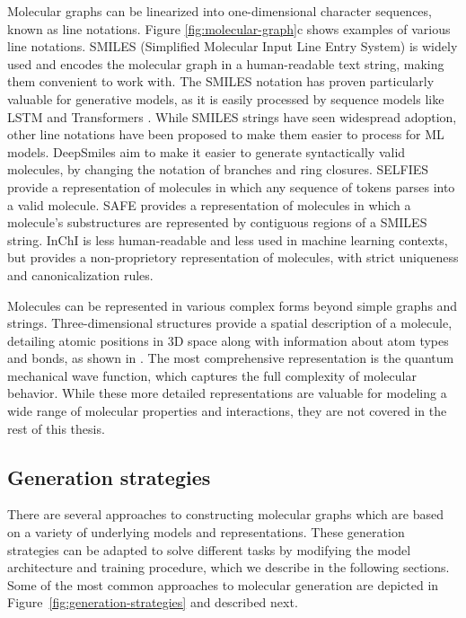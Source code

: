 Molecular graphs can be linearized into one-dimensional character sequences, known as line
notations. Figure \ref{fig:molecular-graph}c shows examples of various line notations. SMILES
(Simplified Molecular Input Line Entry System) \citep{weiningerSMILESChemicalLanguage1988} is
widely used and encodes the molecular graph in a human-readable text string, making them
convenient to work with. The SMILES notation has proven particularly valuable for
generative models, as it is easily processed by sequence models like \ac{LSTM}
\citep{hochreiterLongShorttermMemory1997} and Transformers \citep{vaswaniAttentionAllYou2017}. While
SMILES strings have seen widespread adoption, other line notations have been proposed to make them
easier to process for \ac{ML} models. DeepSmiles
\citep{oboyleDeepSMILESAdaptationSMILES2018} aim to make it easier to generate syntactically valid
molecules, by changing the notation of branches and ring closures. SELFIES
\citep{krennSELFIESFutureMolecular2022} provide a representation of molecules in which any sequence
of tokens parses into a valid molecule. SAFE \citep{noutahiGottaBeSAFE2023} provides a
representation of molecules in which a molecule's substructures are represented by contiguous
regions of a SMILES string. InChI \citep{hellerInChIIUPACInternational2015} is less human-readable
and less used in machine learning contexts, but provides a non-proprietory representation of
molecules, with strict uniqueness and canonicalization rules.

Molecules can be represented in various complex forms beyond simple graphs and strings.
Three-dimensional structures provide a spatial description of a molecule, detailing atomic positions
in 3D space along with information about atom types and bonds, as shown in
. The most comprehensive representation is the quantum mechanical
wave function, which captures the full complexity of molecular behavior. While these more
detailed representations are valuable for modeling a wide range of molecular properties and
interactions, they are not covered in the rest of this thesis.

\subsection{Generation strategies}
There are several approaches to constructing molecular graphs which are based on a variety of
underlying models and representations. These generation strategies can be adapted to solve different
tasks by modifying the model architecture and training procedure, which we describe in the following
sections. Some of the most common approaches to molecular generation are depicted in
Figure~\ref{fig:generation-strategies} and described next.

